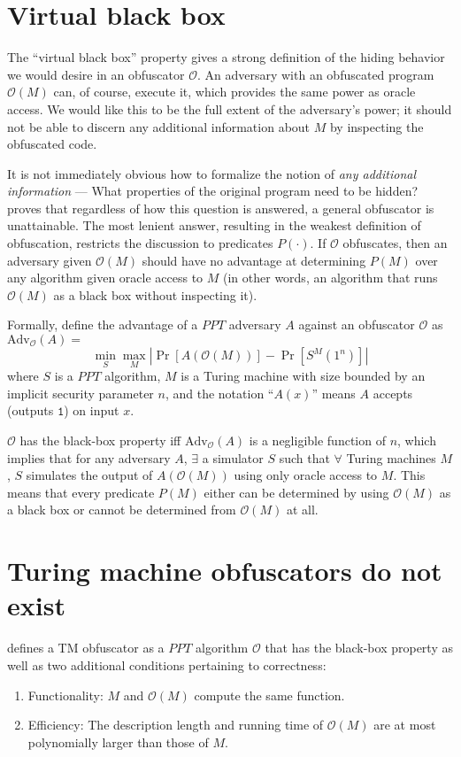 \documentclass[10pt,twocolumn]{article}
\newcommand{\abs}[1]{{\ensuremath{\left\vert#1\right\vert}}}
\def\one{\texttt{1}}
\def\ppt{\textit{PPT}}
\def\obf{\ensuremath{\mathcal{O}}}
\def\Adv{\text{Adv}}
\begin{document}
  \section{Virtual black box}

    The ``virtual black box'' property gives a strong definition of the hiding behavior we would desire
    in an obfuscator $\obf$.
    An adversary with an obfuscated program $\obf(M)$ can, of course, execute it, which provides the same
    power as oracle access.
    We would like this to be the full extent of the adversary's power; it should not be able to discern
    any additional information about $M$ by inspecting the obfuscated code.

    It is not immediately obvious how to formalize the notion of \textit{any additional information} ---
    What properties of the original program need to be hidden?
    \cite{onThe(Im)possibility} proves that regardless of how this question is answered,
    a general obfuscator is unattainable.
    The most lenient answer, resulting in the weakest definition of obfuscation, restricts the discussion
    to predicates $P(\cdot)$. If $\obf$ obfuscates, then an adversary given $\obf(M)$ should have no advantage
    at determining $P(M)$ over any algorithm given oracle access to $M$ (in other words, an algorithm
    that runs $\obf(M)$ as a black box without inspecting it).

    Formally, define the advantage of a $\ppt$ adversary $A$ against an obfuscator $\obf$ as $\Adv_\obf(A) =$
    \[ \min_S \max_M \abs{ \Pr[ A(\obf(M)) ] - \Pr[ S^M(1^n) ] } \]
    where $S$ is a $\ppt$ algorithm, $M$ is a Turing machine with size bounded by an implicit security parameter $n$,
    and the notation ``$A(x)$'' means $A$ accepts (outputs $\one$) on input $x$.

    $\obf$ has the black-box property iff $\Adv_\obf(A)$ is a negligible function of $n$,
    which implies that for any adversary $A$, $\exists$ a simulator $S$ such that $\forall$ Turing machines $M$,
    $S$ simulates the output of $A(\obf(M))$ using only oracle access to $M$.
    This means that every predicate $P(M)$ either can be determined by using $\obf(M)$ as a black box
    or cannot be determined from $\obf(M)$ at all.

  \section{Turing machine obfuscators do not exist}

    \cite{onThe(Im)possibility} defines a TM obfuscator as a $\ppt$ algorithm $\obf$ that has
    the black-box property as well as two additional conditions pertaining to correctness:
    \begin{enumerate}
      \item Functionality: $M$ and $\obf(M)$ compute the same function.
      \item Efficiency: The description length and running time of $\obf(M)$
            are at most polynomially larger than those of $M$.
    \end{enumerate}
\end{document}
